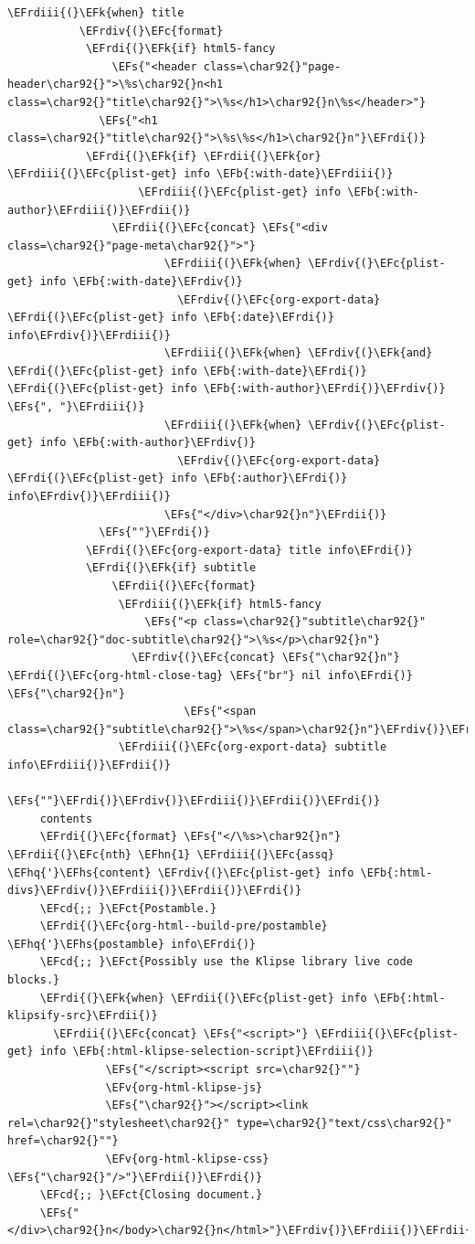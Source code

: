 \documentclass{scrartcl}
\newcommand{\EFk}[1]{\textcolor{EFk}{#1}} %
\newcommand{\EFs}[1]{\textcolor{EFs}{#1}} %
\newcommand{\EFb}[1]{\textcolor{EFb}{#1}} %
\newcommand{\EFct}[1]{\textcolor{EFct}{#1}} %
\newcommand{\EFc}[1]{\textcolor{EFc}{#1}} %
\newcommand{\EFv}[1]{\textcolor{EFv}{#1}} %
\newcommand{\EFcd}[1]{\textcolor{EFcd}{#1}} %
\newcommand{\EFhn}[1]{\textcolor{EFhn}{\textbf{#1}}} %
\newcommand{\EFhq}[1]{\textcolor{EFhq}{#1}} %
\newcommand{\EFhs}[1]{\textcolor{EFhs}{#1}} %
\newcommand{\EFrdi}[1]{\textcolor{EFrdi}{#1}} %
\newcommand{\EFrdii}[1]{\textcolor{EFrdii}{#1}} %
\newcommand{\EFrdiii}[1]{\textcolor{EFrdiii}{#1}} %
\newcommand{\EFrdiv}[1]{\textcolor{EFrdiv}{#1}} %
\begin{document}
\begin{Code}
\begin{Verbatim}[]
         \EFrdiii{(}\EFk{when} title
           \EFrdiv{(}\EFc{format}
            \EFrdi{(}\EFk{if} html5-fancy
                \EFs{"<header class=\char92{}"page-header\char92{}">\%s\char92{}n<h1 class=\char92{}"title\char92{}">\%s</h1>\char92{}n\%s</header>"}
              \EFs{"<h1 class=\char92{}"title\char92{}">\%s\%s</h1>\char92{}n"}\EFrdi{)}
            \EFrdi{(}\EFk{if} \EFrdii{(}\EFk{or} \EFrdiii{(}\EFc{plist-get} info \EFb{:with-date}\EFrdiii{)}
                    \EFrdiii{(}\EFc{plist-get} info \EFb{:with-author}\EFrdiii{)}\EFrdii{)}
                \EFrdii{(}\EFc{concat} \EFs{"<div class=\char92{}"page-meta\char92{}">"}
                        \EFrdiii{(}\EFk{when} \EFrdiv{(}\EFc{plist-get} info \EFb{:with-date}\EFrdiv{)}
                          \EFrdiv{(}\EFc{org-export-data} \EFrdi{(}\EFc{plist-get} info \EFb{:date}\EFrdi{)} info\EFrdiv{)}\EFrdiii{)}
                        \EFrdiii{(}\EFk{when} \EFrdiv{(}\EFk{and} \EFrdi{(}\EFc{plist-get} info \EFb{:with-date}\EFrdi{)} \EFrdi{(}\EFc{plist-get} info \EFb{:with-author}\EFrdi{)}\EFrdiv{)} \EFs{", "}\EFrdiii{)}
                        \EFrdiii{(}\EFk{when} \EFrdiv{(}\EFc{plist-get} info \EFb{:with-author}\EFrdiv{)}
                          \EFrdiv{(}\EFc{org-export-data} \EFrdi{(}\EFc{plist-get} info \EFb{:author}\EFrdi{)} info\EFrdiv{)}\EFrdiii{)}
                        \EFs{"</div>\char92{}n"}\EFrdii{)}
              \EFs{""}\EFrdi{)}
            \EFrdi{(}\EFc{org-export-data} title info\EFrdi{)}
            \EFrdi{(}\EFk{if} subtitle
                \EFrdii{(}\EFc{format}
                 \EFrdiii{(}\EFk{if} html5-fancy
                     \EFs{"<p class=\char92{}"subtitle\char92{}" role=\char92{}"doc-subtitle\char92{}">\%s</p>\char92{}n"}
                   \EFrdiv{(}\EFc{concat} \EFs{"\char92{}n"} \EFrdi{(}\EFc{org-html-close-tag} \EFs{"br"} nil info\EFrdi{)} \EFs{"\char92{}n"}
                           \EFs{"<span class=\char92{}"subtitle\char92{}">\%s</span>\char92{}n"}\EFrdiv{)}\EFrdiii{)}
                 \EFrdiii{(}\EFc{org-export-data} subtitle info\EFrdiii{)}\EFrdii{)}
              \EFs{""}\EFrdi{)}\EFrdiv{)}\EFrdiii{)}\EFrdii{)}\EFrdi{)}
     contents
     \EFrdi{(}\EFc{format} \EFs{"</\%s>\char92{}n"} \EFrdii{(}\EFc{nth} \EFhn{1} \EFrdiii{(}\EFc{assq} \EFhq{'}\EFhs{content} \EFrdiv{(}\EFc{plist-get} info \EFb{:html-divs}\EFrdiv{)}\EFrdiii{)}\EFrdii{)}\EFrdi{)}
     \EFcd{;; }\EFct{Postamble.}
     \EFrdi{(}\EFc{org-html--build-pre/postamble} \EFhq{'}\EFhs{postamble} info\EFrdi{)}
     \EFcd{;; }\EFct{Possibly use the Klipse library live code blocks.}
     \EFrdi{(}\EFk{when} \EFrdii{(}\EFc{plist-get} info \EFb{:html-klipsify-src}\EFrdii{)}
       \EFrdii{(}\EFc{concat} \EFs{"<script>"} \EFrdiii{(}\EFc{plist-get} info \EFb{:html-klipse-selection-script}\EFrdiii{)}
               \EFs{"</script><script src=\char92{}""}
               \EFv{org-html-klipse-js}
               \EFs{"\char92{}"></script><link rel=\char92{}"stylesheet\char92{}" type=\char92{}"text/css\char92{}" href=\char92{}""}
               \EFv{org-html-klipse-css} \EFs{"\char92{}"/>"}\EFrdii{)}\EFrdi{)}
     \EFcd{;; }\EFct{Closing document.}
     \EFs{"</div>\char92{}n</body>\char92{}n</html>"}\EFrdiv{)}\EFrdiii{)}\EFrdii{)}


\end{Verbatim}
\end{Code}
\end{document}
